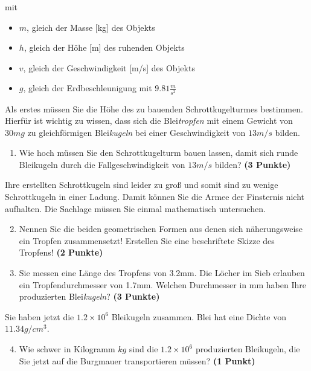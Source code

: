 \documentclass[a4paper, 10pt]{scrartcl}\usepackage[]{graphicx}\usepackage[]{xcolor}
\begin{document}
mit

\begin{itemize}
\item $m$, gleich der Masse [kg] des Objekts
\item $h$, gleich der H{\"o}he [m] des ruhenden Objekts
\item $v$, gleich der Geschwindigkeit [m/s] des Objekts
\item $g$, gleich der Erdbeschleunigung mit $9.81 \tfrac{m}{s^2}$ 
\end{itemize}

Als erstes m{\"u}ssen Sie die H{\"o}he des zu bauenden Schrottkugelturmes
bestimmen. Hierf{\"u}r ist wichtig zu wissen, dass sich die
Blei\textit{tropfen} mit einem Gewicht von $30mg$ zu
gleichf{\"o}rmigen Blei\textit{kugeln} bei einer Geschwindigkeit von
$13m/s$ bilden.

\begin{enumerate}
\item Wie hoch m{\"u}ssen Sie den Schrottkugelturm bauen lassen, damit sich
  runde Bleikugeln durch die Fallgeschwindigkeit von $13m/s$ bilden?
  \textbf{(3 Punkte)}
\end{enumerate}

Ihre erstellten Schrottkugeln sind leider zu gro{\ss} und somit sind zu wenige
Schrottkugeln in einer Ladung. Damit k{\"o}nnen Sie die Armee der Finsternis
nicht aufhalten. Die Sachlage m{\"u}ssen Sie einmal mathematisch untersuchen.

\begin{enumerate}
  \setcounter{enumi}{1}
\item Nennen Sie die beiden geometrischen Formen aus denen sich
  n{\"a}herungsweise ein Tropfen zusammensetzt! Erstellen Sie eine beschriftete 
  Skizze des Tropfens!
  \textbf{(2 Punkte)}
\item Sie messen eine L{\"a}nge des Tropfens von 3.2mm. Die L{\"o}cher
  im Sieb erlauben ein Tropfendurchmesser von 1.7mm. Welchen
  Durchmesser in mm haben Ihre produzierten Blei\textit{kugeln}?  \textbf{(3 Punkte)}
\end{enumerate}

Sie haben jetzt die \ensuremath{1.2\times 10^{6}} Bleikugeln zusammen. Blei hat eine Dichte
von $11.34g/cm^3$.

\begin{enumerate}
  \setcounter{enumi}{3}
\item Wie schwer in Kilogramm $kg$ sind die \ensuremath{1.2\times 10^{6}} produzierten
  Bleikugeln, die Sie jetzt auf die Burgmauer transportieren m{\"u}ssen?
  \textbf{(1 Punkt)}
\end{enumerate}
\end{document}
